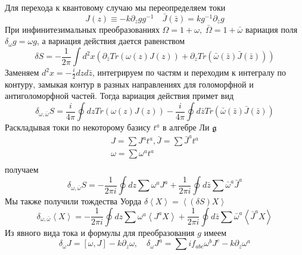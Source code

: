Для перехода к квантовому случаю мы переопределяем токи
\begin{equation}
  \label{eq:82}
  J(z)\equiv -k \partial_zg g^{-1}\quad \bar J(\bar z)=k g^{-1}\partial_{\bar z}g
\end{equation}
 При инфинитезимальных преобразованиях $\Omega=1+\omega,\; \bar \Omega =1+\bar \omega$ вариация поля
 $\delta_{\omega}g=\omega g$, а вариация действия дается равенством
 \begin{equation}
   \label{eq:11}
   \delta S=-\frac{1}{2\pi}\int d^2 x \left(\partial_{\bar z}Tr(\omega(z)J(z))+\partial_z Tr(\bar
     \omega(\bar z)\bar J(\bar z))\right)
 \end{equation}
Заменяем $d^2 x=-\frac{i}{2} dz d\bar z$, интегрируем по частям и переходим к интегралу по контуру, замыкая
контур в разных направлениях для голоморфной и антиголоморфной частей.
Тогда вариация действия примет вид
\begin{equation}
  \label{eq:83}
  \delta_{\omega,\bar\omega}S=\frac{i}{4\pi}\oint dz Tr (\omega(z)J(z))-\frac{i}{4\pi}\oint d\bar z Tr(\bar\omega(\bar z)\bar J(\bar z))
\end{equation}
Раскладывая токи по некоторому базису $t^{a}$ в алгебре Ли $\mathfrak{g}$
\begin{equation}
  \label{eq:85}
  \begin{aligned}
    J=\sum J^a t^a,\bar J=\sum \bar J^a t^a \\
    \omega=\sum \omega^a t^a\\
  \end{aligned}
\end{equation}
получаем
\begin{equation}
  \label{eq:86}
  \delta_{\omega,\bar \omega}S=-\frac{1}{2\pi i}\oint dz \sum\omega^a J^a+\frac{1}{2\pi i} \oint d\bar z \sum \bar \omega^a \bar J^a
\end{equation}
Мы также получили тождества Уорда $\delta\left< X\right>=\left<(\delta S)X\right>$
\begin{equation}
  \label{eq:87}
  \delta_{\omega,\bar \omega}\left< X \right>=-\frac{1}{2\pi i}\oint dz \sum\omega^a \left< J^a X\right>+
  \frac{1}{2\pi i} \oint d\bar z \sum \bar \omega^a \left< \bar J^a X\right>
\end{equation}
Из явного вида тока и формулы для преобразования $g$ имеем
\begin{equation}
  \label{eq:88}
  \delta_{\omega}J=[\omega,J]-k\partial_z\omega,\quad \delta_{\omega}J^a=\sum i f_{abc}\omega^b J^c-k\partial_z\omega^a
\end{equation}
